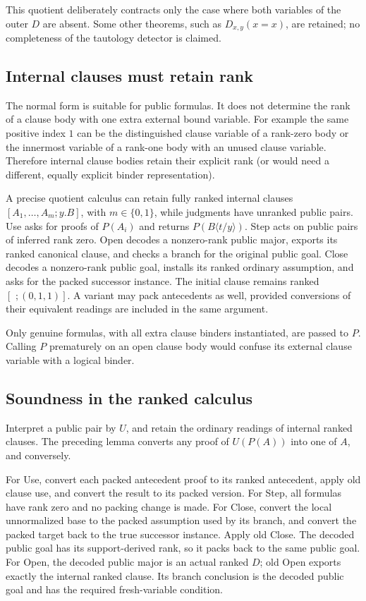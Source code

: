 This quotient deliberately contracts only the case where both variables
of the outer \(D\) are absent. Some other theorems, such as
\(D_{x,y}(x=x)\), are retained; no completeness of the tautology detector
is claimed.

\subsection{Internal clauses must retain rank}
The normal form is suitable for public formulas. It does not determine
the rank of a clause body with one extra external bound variable.
For example the same positive index \(1\) can be the distinguished
clause variable of a rank-zero body or the innermost variable of a
rank-one body with an unused clause variable. Therefore internal clause
bodies retain their explicit rank (or would need a different,
equally explicit binder representation).

A precise quotient calculus can retain fully ranked internal clauses
\([A_1,\ldots,A_m;y.B]\), with \(m\in\{0,1\}\), while judgments have
unranked public pairs. Use asks for proofs of \(P(A_i)\) and returns
\(P(B\langle t/y\rangle)\). Step acts on public pairs of inferred rank
zero. Open decodes a nonzero-rank public major, exports its ranked
canonical clause, and checks a branch for the original public goal.
Close decodes a nonzero-rank public goal, installs its ranked ordinary
assumption, and asks for the packed successor instance. The initial
clause remains ranked \([\,\,;(0,1,1)]\).
A variant may pack antecedents as well, provided conversions of their
equivalent readings are included in the same argument.

Only genuine formulas, with all extra clause binders instantiated,
are passed to \(P\). Calling \(P\) prematurely on an open clause body
would confuse its external clause variable with a logical binder.

\subsection{Soundness in the ranked calculus}
Interpret a public pair by \(U\), and retain the ordinary readings of
internal ranked clauses. The preceding lemma converts any proof of
\(U(P(A))\) into one of \(A\), and conversely.

For Use, convert each packed antecedent proof to its ranked antecedent,
apply old clause use, and convert the result to its packed version.
For Step, all formulas have rank zero and no packing change is made.
For Close, convert the local unnormalized base to the packed assumption
used by its branch, and convert the packed target back to the true
successor instance. Apply old Close. The decoded public goal has its
support-derived rank, so it packs back to the same public goal.
For Open, the decoded public major is an actual ranked \(D\); old Open
exports exactly the internal ranked clause. Its branch conclusion is
the decoded public goal and has the required fresh-variable condition.

